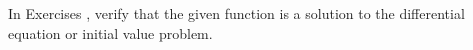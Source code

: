 {\noindent In Exercises}
{, verify that the given function is a solution to the differential equation or initial value problem.}
